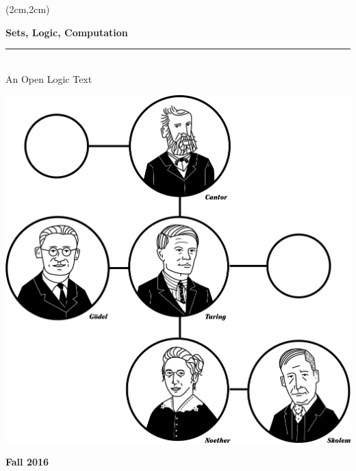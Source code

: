 \documentclass[11pt,openany]{memoir}
\begin{document}

\AtBeginShipoutNext{\AtBeginShipoutNext{\AtBeginShipoutDiscard}}

\begin{titlingpage}
  \pagecolor{leadbeater}
  \begin{textblock*}{14cm}(2cm,2cm)%
    \begin{raggedright}
      \fontsize{32pt}{34pt}\selectfont\bfseries\sffamily%
      Sets, Logic, Computation\\
      \normalfont\fontsize{18pt}{0pt}\selectfont\bfseries\itshape%
      \rule{14cm}{5pt}\\[5pt]
      An Open Logic Text
    \end{raggedright}

\vskip1cm\hskip-1cm\includegraphics[scale=.85]{illustrations/Cover}

\par\noindent
\vskip 1.5cm
\normalfont\fontsize{16pt}{0pt}\selectfont\bfseries\sffamily%
\hfill Fall 2016
\end{textblock*}
\
\end{titlingpage}

\nopagecolor



\end{document}
